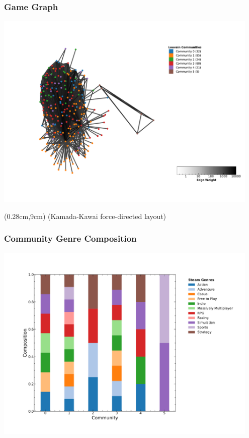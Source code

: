 \documentclass[18pt,xcolor=table]{beamer} \usefonttheme[onlymath]{serif}
\begin{document}
\begin{frame}
  \frametitle{Game Graph}
  \centering
  \includegraphics[width=0.95\textwidth,trim={5cm 3cm 0.5cm 3.7cm},clip]{../output/graph.pdf} %
  \begin{textblock*}{3.8cm}(0.28cm,9cm)
{\tiny (Kamada-Kawai force-directed layout)}
  \end{textblock*}
\end{frame}

\begin{frame}
  \frametitle{Community Genre Composition}
  \centering
  \includegraphics[width=0.95\textwidth]{../output/genre_comps.pdf}
\end{frame}
\end{document}
